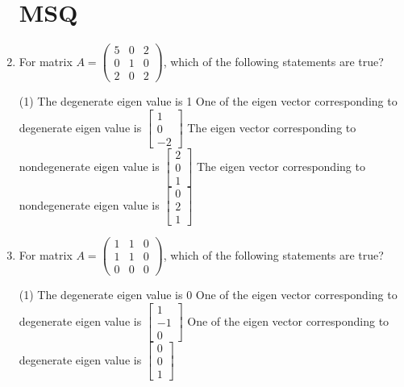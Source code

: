 \begin{enumerate}
       \section{MSQ}  
 \item For matrix $A=\left(\begin{array}{lll}5 & 0 & 2 \\ 0 & 1 & 0 \\ 2 & 0 & 2\end{array}\right)$, which of the following statements are true?
                 \begin{tasks}(1)
                	\task[\textbf{a.}]The degenerate eigen value is 1
                	\task[\textbf{b.}]One of the eigen vector corresponding to degenerate eigen value is $\left[\begin{array}{c}1 \\ 0 \\ -2\end{array}\right]$
                	\task[\textbf{c.}]The eigen vector corresponding to nondegenerate eigen value is $\left[\begin{array}{l}2 \\ 0 \\ 1\end{array}\right]$
                	\task[\textbf{d.}] The eigen vector corresponding to nondegenerate eigen value is $\left[\begin{array}{l}0 \\ 2 \\ 1\end{array}\right]$   
                \end{tasks}
 \item   For matrix $A=\left(\begin{array}{lll}1 & 1 & 0 \\ 1 & 1 & 0 \\ 0 & 0 & 0\end{array}\right)$, which of the following statements are true?    
                 \begin{tasks}(1)
                	\task[\textbf{a.}]The degenerate eigen value is 0
                	\task[\textbf{b.}]One of the eigen vector corresponding to degenerate eigen value is $\left[\begin{array}{c}1 \\ -1 \\ 0\end{array}\right]$
                	\task[\textbf{c.}]One of the eigen vector corresponding to degenerate eigen value is $\left[\begin{array}{l}0 \\ 0 \\ 1\end{array}\right]$

\end{tasks}
\end{enumerate}
